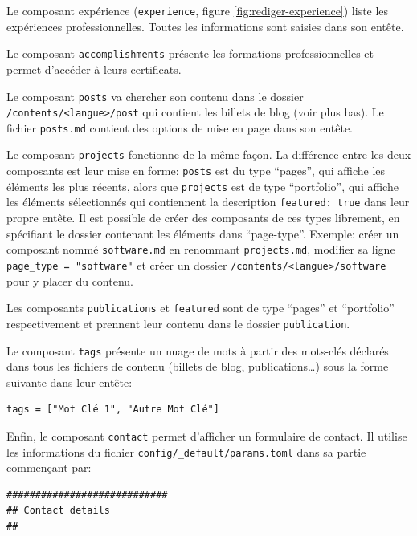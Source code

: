 \documentclass[
  12pt,
  french,
  a4paper,
  extrafontsizes,onecolumn,openright
  ]{memoir}
\begin{document}
\normalsize

Le composant expérience (\texttt{experience}, figure \ref{fig:rediger-experience}) liste les expériences professionnelles.
Toutes les informations sont saisies dans son entête.

Le composant \texttt{accomplishments} présente les formations professionnelles et permet d'accéder à leurs certificats.

Le composant \texttt{posts} va chercher son contenu dans le dossier \texttt{/contents}\break\texttt{/\textless{}langue\textgreater{}/post} qui contient les billets de blog (voir plus bas).
Le fichier \texttt{posts.md} contient des options de mise en page dans son entête.

Le composant \texttt{projects} fonctionne de la même façon.
La différence entre les deux composants est leur mise en forme: \texttt{posts} est du type \enquote{pages}, qui affiche les éléments les plus récents, alors que \texttt{projects} est de type \enquote{portfolio}, qui affiche les éléments sélectionnés qui contiennent la description \texttt{featured:\ true} dans leur propre entête.
Il est possible de créer des composants de ces types librement, en spécifiant le dossier contenant les éléments dans \enquote{page-type}.
Exemple: créer un composant nommé \texttt{software.md} en renommant \texttt{projects.md}, modifier sa ligne \texttt{page\_type\ =\ "software"} et créer un dossier \texttt{/contents/\textless{}langue\textgreater{}/software} pour y placer du contenu.

Les composants \texttt{publications} et \texttt{featured} sont de type \enquote{pages} et \enquote{portfolio} respectivement et prennent leur contenu dans le dossier \texttt{publication}.

Le composant \texttt{tags} présente un nuage de mots à partir des mots-clés déclarés dans tous les fichiers de contenu (billets de blog, publications\ldots) sous la forme suivante dans leur entête:

\begin{verbatim}
tags = ["Mot Clé 1", "Autre Mot Clé"]
\end{verbatim}

Enfin, le composant \texttt{contact} permet d'afficher un formulaire de contact.
Il utilise les informations du fichier \texttt{config/\_default/params.toml} dans sa partie commençant par:

\begin{verbatim}
############################
## Contact details
##
\end{verbatim}
\end{document}
